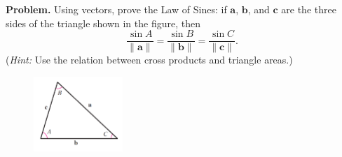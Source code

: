 \documentclass[12pt]{article}
\title{}
\date{}
\newcommand{\norm}[1]{\lVert #1 \rVert}
\begin{document}
\noindent
{\bf Problem.}
Using vectors, prove the Law of Sines: if $\mathbf a$, $\mathbf b$, and $\mathbf c$ are the three sides of the triangle shown in the figure, then
\[
\frac{\sin A}{\norm{\mathbf a}}=\frac{\sin B}{\norm{\mathbf b}}=\frac{\sin C}{\norm{\mathbf c}}.
\]
({\it Hint:} Use the relation between cross products and triangle areas.)
\begin{figure}[h]
\includegraphics[width=0.3\textwidth, right]{sinelaw.png}
\end{figure}
\end{document}
